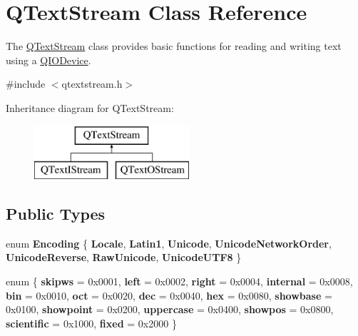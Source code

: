 \hypertarget{class_q_text_stream}{}\section{Q\+Text\+Stream Class Reference}
\label{class_q_text_stream}


The \mbox{\hyperlink{class_q_text_stream}{Q\+Text\+Stream}} class provides basic functions for reading and writing text using a \mbox{\hyperlink{class_q_i_o_device}{Q\+I\+O\+Device}}.  




{\ttfamily \#include $<$qtextstream.\+h$>$}

Inheritance diagram for Q\+Text\+Stream\+:\begin{figure}[H]
\begin{center}
\leavevmode
\includegraphics[height=2.000000cm]{class_q_text_stream}
\end{center}
\end{figure}
\subsection*{Public Types}
\begin{DoxyCompactItemize}
\item 
\mbox{\label{class_q_text_stream_aeaa17ac9a577eb636e8fd337115da817}} 
enum {\bfseries Encoding} \{ \newline
{\bfseries Locale}, 
{\bfseries Latin1}, 
{\bfseries Unicode}, 
{\bfseries Unicode\+Network\+Order}, 
\newline
{\bfseries Unicode\+Reverse}, 
{\bfseries Raw\+Unicode}, 
{\bfseries Unicode\+U\+T\+F8}
 \}
\item 
\mbox{\label{class_q_text_stream_acec251f58a9b0a3a44e51f11459489fd}} 
enum \{ \newline
{\bfseries skipws} = 0x0001, 
{\bfseries left} = 0x0002, 
{\bfseries right} = 0x0004, 
{\bfseries internal} = 0x0008, 
\newline
{\bfseries bin} = 0x0010, 
{\bfseries oct} = 0x0020, 
{\bfseries dec} = 0x0040, 
{\bfseries hex} = 0x0080, 
\newline
{\bfseries showbase} = 0x0100, 
{\bfseries showpoint} = 0x0200, 
{\bfseries uppercase} = 0x0400, 
{\bfseries showpos} = 0x0800, 
\newline
{\bfseries scientific} = 0x1000, 
{\bfseries fixed} = 0x2000
 \}
\end{DoxyCompactItemize}
